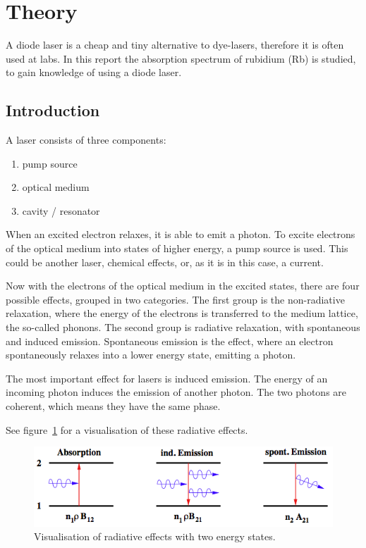 \section{Theory}\label{theory}

A diode laser is a cheap and tiny alternative to dye-lasers, therefore it is often used at labs.
In this report the absorption spectrum of rubidium (Rb) is studied, to gain knowledge of using
a diode laser.

\subsection{Introduction}\label{introduction}

A laser consists of three components:

\begin{enumerate}
  \item pump source
  \item optical medium
  \item cavity / resonator
\end{enumerate}

When an excited electron relaxes, it is able to emit a photon.
To excite electrons of the optical medium into states of higher energy, a pump source is used.
This could be another laser, chemical effects, or, as it is in this case, a current.

Now with the electrons of the optical medium in the excited states, there are four possible
effects, grouped in two categories.
The first group is the non-radiative relaxation, where the energy of the electrons is transferred
to the medium lattice, the so-called phonons.
The second group is radiative relaxation, with spontaneous and induced emission.
Spontaneous emission is the effect, where an electron spontaneously relaxes into a lower energy
state, emitting a photon.

The most important effect for lasers is induced emission.
The energy of an incoming photon induces the emission of another photon.
The two photons are coherent, which means they have the same phase.

See figure~\ref{fig:two_niveau_laser} for a visualisation of these radiative effects.
\begin{figure}[ht]
  \centering
  \includegraphics[width=0.8\linewidth]{content/zweiniveausystem.png}
  \caption{Visualisation of radiative effects with two energy states\cite{anleitung_hene}.}%
  \label{fig:two_niveau_laser}
\end{figure}

